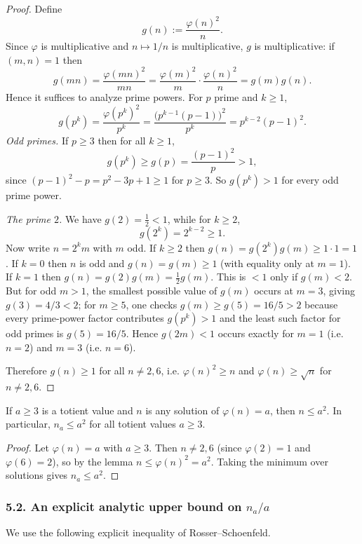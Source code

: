 \begin{proof}
Define
\[g(n):=\frac{\varphi(n)^2}{n}.
\]
Since $\varphi$ is multiplicative and $n\mapsto 1/n$ is multiplicative, $g$ is multiplicative:
if $(m,n)=1$ then
\[
 g(mn)=\frac{\varphi(mn)^2}{mn}=\frac{\varphi(m)^2}{m}\cdot\frac{\varphi(n)^2}{n}=g(m)g(n).
\]
Hence it suffices to analyze prime powers.
For $p$ prime and $k\ge 1$,
\[
 g(p^k)=\frac{\varphi(p^k)^2}{p^k}=\frac{\bigl(p^{k-1}(p-1)\bigr)^2}{p^k}=p^{k-2}(p-1)^2.
\]
\emph{Odd primes.}
If $p\ge 3$ then for all $k\ge 1$,
\[
 g(p^k)\ge g(p)=\frac{(p-1)^2}{p} > 1,
\]
since $(p-1)^2-p=p^2-3p+1\ge 1$ for $p\ge 3$.
So $g(p^k)>1$ for every odd prime power.

\emph{The prime $2$.}
We have $g(2)=\frac{1}{2}<1$, while for $k\ge 2$,
\[
 g(2^k)=2^{k-2}\ge 1.
\]
Now write $n=2^k m$ with $m$ odd.
If $k\ge 2$ then $g(n)=g(2^k)g(m)\ge 1\cdot 1=1$.
If $k=0$ then $n$ is odd and $g(n)=g(m)\ge 1$ (with equality only at $m=1$).
If $k=1$ then $g(n)=g(2)g(m)=\tfrac12 g(m)$.
This is $<1$ only if $g(m)<2$.
But for odd $m>1$, the smallest possible value of $g(m)$ occurs at $m=3$, giving $g(3)=4/3<2$; for $m\ge 5$, one checks $g(m)\ge g(5)=16/5>2$ because every prime-power factor contributes $g(p^k)>1$ and the least such factor for odd primes is $g(5)=16/5$.
Hence $g(2m)<1$ occurs exactly for $m=1$ (i.e. $n=2$) and $m=3$ (i.e. $n=6$).

Therefore $g(n)\ge 1$ for all $n\neq 2,6$, i.e. $\varphi(n)^2\ge n$ and $\varphi(n)\ge \sqrt n$ for $n\neq 2,6$.
\end{proof}

\begin{corollary}
If $a\ge 3$ is a totient value and $n$ is any solution of $\varphi(n)=a$, then $n\le a^2$.
In particular, $n_a\le a^2$ for all totient values $a\ge 3$.
\end{corollary}

\begin{proof}
Let $\varphi(n)=a$ with $a\ge 3$.
Then $n\neq 2,6$ (since $\varphi(2)=1$ and $\varphi(6)=2$), so by the lemma $n\le \varphi(n)^2=a^2$.
Taking the minimum over solutions gives $n_a\le a^2$.
\end{proof}

\subsubsection*{5.2. An explicit analytic upper bound on $n_a/a$}
We use the following explicit inequality of Rosser--Schoenfeld.


